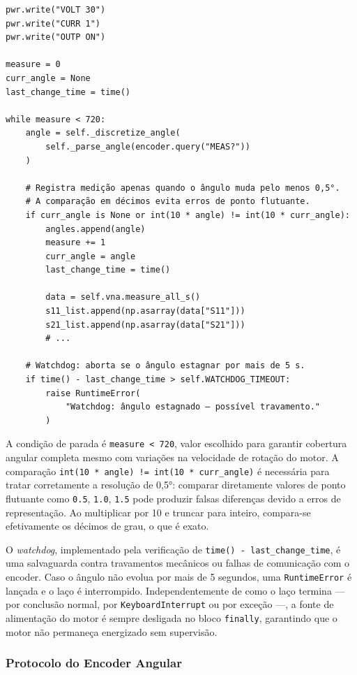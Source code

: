\documentclass[12pt, a4paper]{article}
\begin{document}
\begin{lstlisting}[style=python, caption={Laço principal de varredura angular (\texttt{drivers/system.py}).}]
pwr.write("VOLT 30")
pwr.write("CURR 1")
pwr.write("OUTP ON")

measure = 0
curr_angle = None
last_change_time = time()

while measure < 720:
    angle = self._discretize_angle(
        self._parse_angle(encoder.query("MEAS?"))
    )

    # Registra medição apenas quando o ângulo muda pelo menos 0,5°.
    # A comparação em décimos evita erros de ponto flutuante.
    if curr_angle is None or int(10 * angle) != int(10 * curr_angle):
        angles.append(angle)
        measure += 1
        curr_angle = angle
        last_change_time = time()

        data = self.vna.measure_all_s()
        s11_list.append(np.asarray(data["S11"]))
        s21_list.append(np.asarray(data["S21"]))
        # ...

    # Watchdog: aborta se o ângulo estagnar por mais de 5 s.
    if time() - last_change_time > self.WATCHDOG_TIMEOUT:
        raise RuntimeError(
            "Watchdog: ângulo estagnado — possível travamento."
        )
\end{lstlisting}

A condição de parada é \texttt{measure < 720}, valor escolhido para garantir cobertura angular completa mesmo com variações na velocidade de rotação do motor. A comparação \texttt{int(10 * angle) != int(10 * curr\_angle)} é necessária para tratar corretamente a resolução de 0,5°: comparar diretamente valores de ponto flutuante como \texttt{0.5}, \texttt{1.0}, \texttt{1.5} pode produzir falsas diferenças devido a erros de representação. Ao multiplicar por 10 e truncar para inteiro, compara-se efetivamente os décimos de grau, o que é exato.

O \textit{watchdog}, implementado pela verificação de \texttt{time() - last\_change\_time}, é uma salvaguarda contra travamentos mecânicos ou falhas de comunicação com o encoder. Caso o ângulo não evolua por mais de 5 segundos, uma \texttt{RuntimeError} é lançada e o laço é interrompido. Independentemente de como o laço termina --- por conclusão normal, por \texttt{KeyboardInterrupt} ou por exceção ---, a fonte de alimentação do motor é sempre desligada no bloco \texttt{finally}, garantindo que o motor não permaneça energizado sem supervisão.

\subsubsection{Protocolo do Encoder Angular}
\end{document}

